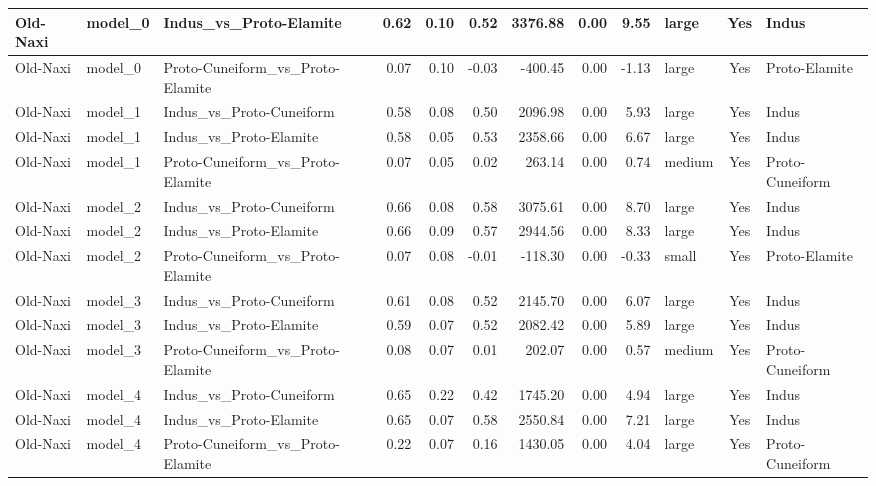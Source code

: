 \documentclass[11pt,a4paper,oneside]{report}
\begin{document}
\begin{landscape}
\begin{scriptsize}
\begin{longtable}{|l|l|l|r|r|r|r|r|r|l|c|l|}
Old-Naxi & model\_0 & Indus\_vs\_Proto-Elamite & 0.62 & 0.10 & 0.52 & 3376.88 & 0.00 & 9.55 & large & Yes & Indus \\ \hline
Old-Naxi & model\_0 & Proto-Cuneiform\_vs\_Proto-Elamite & 0.07 & 0.10 & -0.03 & -400.45 & 0.00 & -1.13 & large & Yes & Proto-Elamite \\ \hline
Old-Naxi & model\_1 & Indus\_vs\_Proto-Cuneiform & 0.58 & 0.08 & 0.50 & 2096.98 & 0.00 & 5.93 & large & Yes & Indus \\ \hline
Old-Naxi & model\_1 & Indus\_vs\_Proto-Elamite & 0.58 & 0.05 & 0.53 & 2358.66 & 0.00 & 6.67 & large & Yes & Indus \\ \hline
Old-Naxi & model\_1 & Proto-Cuneiform\_vs\_Proto-Elamite & 0.07 & 0.05 & 0.02 & 263.14 & 0.00 & 0.74 & medium & Yes & Proto-Cuneiform \\ \hline
Old-Naxi & model\_2 & Indus\_vs\_Proto-Cuneiform & 0.66 & 0.08 & 0.58 & 3075.61 & 0.00 & 8.70 & large & Yes & Indus \\ \hline
Old-Naxi & model\_2 & Indus\_vs\_Proto-Elamite & 0.66 & 0.09 & 0.57 & 2944.56 & 0.00 & 8.33 & large & Yes & Indus \\ \hline
Old-Naxi & model\_2 & Proto-Cuneiform\_vs\_Proto-Elamite & 0.07 & 0.08 & -0.01 & -118.30 & 0.00 & -0.33 & small & Yes & Proto-Elamite \\ \hline
Old-Naxi & model\_3 & Indus\_vs\_Proto-Cuneiform & 0.61 & 0.08 & 0.52 & 2145.70 & 0.00 & 6.07 & large & Yes & Indus \\ \hline
Old-Naxi & model\_3 & Indus\_vs\_Proto-Elamite & 0.59 & 0.07 & 0.52 & 2082.42 & 0.00 & 5.89 & large & Yes & Indus \\ \hline
Old-Naxi & model\_3 & Proto-Cuneiform\_vs\_Proto-Elamite & 0.08 & 0.07 & 0.01 & 202.07 & 0.00 & 0.57 & medium & Yes & Proto-Cuneiform \\ \hline
Old-Naxi & model\_4 & Indus\_vs\_Proto-Cuneiform & 0.65 & 0.22 & 0.42 & 1745.20 & 0.00 & 4.94 & large & Yes & Indus \\ \hline
Old-Naxi & model\_4 & Indus\_vs\_Proto-Elamite & 0.65 & 0.07 & 0.58 & 2550.84 & 0.00 & 7.21 & large & Yes & Indus \\ \hline
Old-Naxi & model\_4 & Proto-Cuneiform\_vs\_Proto-Elamite & 0.22 & 0.07 & 0.16 & 1430.05 & 0.00 & 4.04 & large & Yes & Proto-Cuneiform \\ \hline

\end{longtable}
\end{scriptsize}
\end{landscape}
\end{document}
